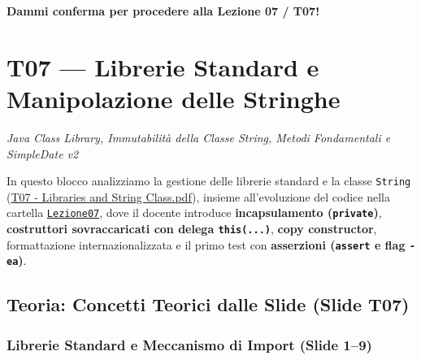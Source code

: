 \documentclass[11pt,a4paper,oneside]{report}
\newcommand{\passthrough}[1]{#1}
\begin{document}
\textbf{Dammi conferma per procedere alla Lezione 07 / T07!}

\newpage
\chapter[T07 --- Librerie Standard e Manipolazione d]{T07 --- Librerie Standard e Manipolazione delle Stringhe}
\label{chap:t07}

{\small\sffamily\color{accentblue!80!black}\textit{Java Class Library, Immutabilità della Classe String, Metodi Fondamentali e SimpleDate v2}}

\vspace{0.8em}

In questo blocco analizziamo la gestione delle librerie standard e la
classe \passthrough{\lstinline!String!}
(\href{file:///home/wally/Documenti/GitHub/Programmazione-II/25-26/Teoria-e-Esercitazioni/Slides-20260902/T07\%20-\%20Libraries\%20and\%20String\%20Class.pdf}{T07
- Libraries and String Class.pdf}), insieme all'evoluzione del codice
nella cartella
\href{file:///home/wally/Documenti/GitHub/Programmazione-II/25-26/Teoria-e-Esercitazioni/Codice-20260902/Lezione07/SimpleDate}{\passthrough{\lstinline!Lezione07!}},
dove il docente introduce \textbf{incapsulamento
(\passthrough{\lstinline!private!})}, \textbf{costruttori sovraccaricati
con delega \passthrough{\lstinline!this(...)!}}, \textbf{copy
constructor}, formattazione internazionalizzata e il primo test con
\textbf{asserzioni (\passthrough{\lstinline!assert!} e flag
\passthrough{\lstinline!-ea!})}.

\section{Teoria: Concetti Teorici dalle Slide (Slide
T07)}\label{chap06_teoria-concetti-teorici-dalle-slide-slide-t07}

\subsection{Librerie Standard e Meccanismo di Import (Slide
1--9)}\label{chap06_librerie-standard-e-meccanismo-di-import-slide-19}
\end{document}
